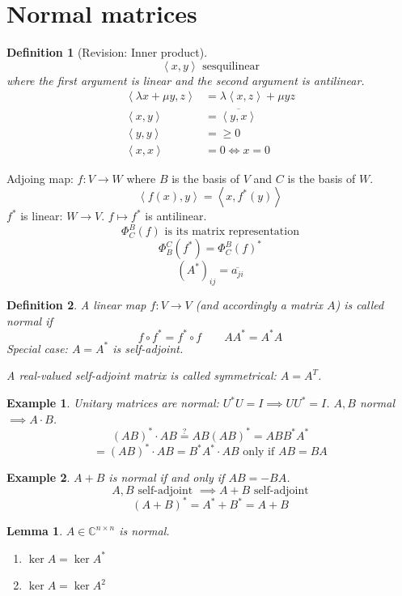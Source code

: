 \documentclass{article}
\newtheorem{example}{Example}  \numberwithin{example}{section}
\newtheorem{definition}{Definition}  \numberwithin{definition}{section}
\newtheorem{lemma}{Lemma}  \numberwithin{lemma}{section}
\newcommand{\angel}[1]{\left\langle#1\right\rangle}
\begin{document}
\section{Normal matrices} %

\begin{definition}[Revision: Inner product] %
  \[ \angel{x,y} \text{ sesquilinear} \]
  where the first argument is linear and the second argument is antilinear.
  \begin{align*}
    \angel{\lambda x + \mu y, z} &= \lambda \angel{x,z} + \mu yz \\
    \angel{x,y} &= \overline{\angel{y, x}} \\
    \angel{y,y} &= \geq 0 \\
    \angel{x,x} &= 0 \iff x = 0
  \end{align*}
\end{definition}

Adjoing map: $f: V \to W$ where $B$ is the basis of $V$ and $C$ is the basis of $W$.
\[ \angel{f(x),y} = \angel{x,f^*(y)} \]
$f^*$ is linear: $W \to V$. $f \mapsto f^*$ is antilinear.
\[ \Phi_C^B(f) \text{ is its matrix representation} \]
\[ \Phi_B^C(f^*) = \Phi_C^B(f)^* \]
\[ (A^*)_{ij} = \overline{a_{ji}} \]

\begin{definition} %
  A linear map $f: V \to V$ (and accordingly a matrix $A$) is called \emph{normal} if
  \[ f \circ f^* = f^* \circ f \qquad A A^* = A^* A \]
  Special case: $A = A^*$ is self-adjoint.

  A real-valued self-adjoint matrix is called \emph{symmetrical}: $A = A^T$.
\end{definition}

\begin{example} %
  Unitary matrices are normal: $U^* U = I \implies U U^* = I$.
  $A, B$ normal $\implies A \cdot B$.
  \[ (AB)^* \cdot AB \overset?= AB (AB)^* = ABB^*A^* \]
  \[ = (AB)^* \cdot AB = B^* A^* \cdot  AB \text{ only if } AB = BA \]
\end{example}

\begin{example}
  $A + B$ is normal if and only if $AB = -BA$.
  \[ A,B \text{ self-adjoint } \implies A+B \text{ self-adjoint} \]
  \[ (A + B)^* = A^* + B^* = A + B \]
\end{example}

\begin{lemma} %
  $A \in \mathbb C^{n \times n}$ is normal.
  \begin{enumerate}
    \item $\ker{A} = \ker{A^*}$
    \item $\ker{A} = \ker{A^2}$
  \end{enumerate}
\end{lemma}
\end{document}
